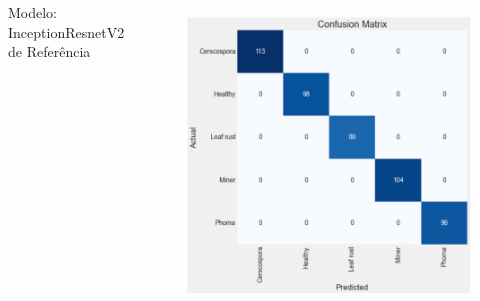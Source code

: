 \documentclass[aspectratio=169]{beamer}
\begin{document}
\begin{frame}
\begin{columns}
        \centering
        \tiny Modelo: InceptionResnetV2 de Referência
        \begin{figure}
            \centering
            \includegraphics[scale=0.39]{img/inceptionreferencia.png}
            \label{fig:enter-label}
        \end{figure}



    \end{columns}
\end{frame}


\end{document}
